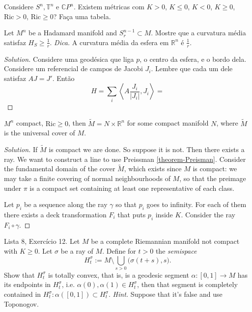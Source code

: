 \begin{exercise}
\label{exercise-Sn-Tn-CPn-existem-curvaturas}
Considere $S^n,\mathbb{T}^n$ e $\mathbb{C}P^{n}$. Existem métricas com $K>0$, $K
\leq 0$, $K<0$, $K \geq 0$, $\text{Ric}>0$, $\text{Ric} \geq 0$? Faça uma
tabela.
\end{exercise}

\begin{exercise}
\label{exercise-Hadamard-manifold-sphere}
Let $M^n$ be a Hadamard manifold and $S^{n-1}_r \subset M$. Mostre que
 a curvatura média satisfaz $H_S\geq \frac{1}{r}$. {\it Dica.} A curvatura média
da esfera em $\mathbb{R}^n$ é $\frac{1}{r}$.
\end{exercise}

\begin{proof}[Solution]
Considere uma geodésica que liga $p$, o centro da esfera, e o bordo dela.
Considere um referencial de campos de Jacobi $J_i$. Lembre que cada um dele
satisfaz $A J=J'$. Então
$$
H=\sum_{i}\left<A \frac{J_i}{|J_i|},J_i\right>=
$$
\end{proof}

\begin{exercise}
\label{exercise-product-of-compact-and-Rn}
$M^n$ compact, $\text{Ric} \geq 0$, then $\tilde{M}=N \times \mathbb{R}^n$ for
some compact manifold $N$, where  $\tilde{M}$ is the universal cover of $M$.
\end{exercise}

\begin{proof}[Solution]
If $\tilde{M}$ is compact we are done. So suppose it is not. Then there exists a
ray. We want to construct a line to use Preissman \ref{theorem-Preisman}.
Consider the fundamental domain of the cover $\tilde{M}$, which exists since
$M$ is compact: we may take a finite covering of normal neighbourhoods of $M$,
so that the preimage under $\pi$ is a compact set containing at least one
representative of each class.

Let $p_i$ be a sequence along the ray $\gamma$ so that $p_i$ goes to infinity.
For each of them there exists a deck transformation $F_i$ that puts $p_i$ inside
$K$. Consider the ray $F_i \circ \gamma$.
\end{proof}

\begin{exercise}
\label{exercise-rays-semispaces}
Lista 8, Exercício 12. Let $M$ be a complete Riemannian manifold not compact
with $K \geq 0$. Let $\sigma$ be a ray of $M$. Define for $t>0$ the {\it
semispace}
$$
H_t^{\sigma}:=M\setminus \bigcup_{s>0}\Big(\sigma(t+s),s).
$$
Show that $H_t^{\sigma}$ is totally convex, that is, is a geodesic segment 
 $\alpha:[0,1]\to M$ has its endpoints in $H_t^{\sigma}$, i.e.
$\alpha(0),\alpha(1) \in H_t^{\sigma}$, then that segment is completely
contained in $H_t^{\sigma}:\alpha([0,1]) \subset H_t^{\sigma}$. {\it Hint.}
Suppose that it's false and use Toponogov.
\end{exercise}

